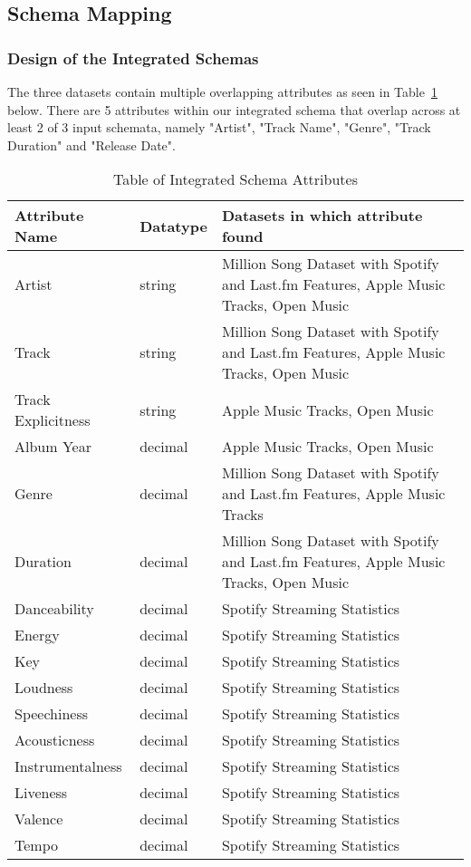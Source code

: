 \documentclass[runningheads]{llncs}
\begin{document}
\subsection{Schema Mapping}
\subsubsection{Design of the Integrated Schemas}
The three datasets contain multiple overlapping attributes as seen in Table~\ref{tab2} below. There are 5 attributes within our integrated schema that overlap across at least 2 of 3 input schemata, namely "Artist", "Track Name", "Genre", "Track Duration" and "Release Date".

\begin{table}[h]
	\renewcommand{\arraystretch}{1.5}
	\caption{Table of Integrated Schema Attributes}\label{tab2}
	\centering
	\begin{tabular}{p{4cm}p{3cm}p{6cm}}
		\toprule
		\textbf{Attribute Name} &  \textbf{ Datatype}&\textbf{Datasets in which  attribute found}\\
		\hline
		\hline
		Artist&string&Million Song Dataset with Spotify and Last.fm Features, Apple Music Tracks, Open Music\\
		Track&string&Million Song Dataset with Spotify and Last.fm Features, Apple Music Tracks, Open Music\\
		Track Explicitness&string&Apple Music Tracks, Open Music\\
		Album Year&decimal&Apple Music Tracks, Open Music\\
		Genre&decimal&Million Song Dataset with Spotify and Last.fm Features, Apple Music Tracks\\
		Duration&decimal&Million Song Dataset with Spotify and Last.fm Features, Apple Music Tracks, Open Music\\
		Danceability&decimal&Spotify  Streaming  Statistics\\
		Energy&decimal&Spotify  Streaming  Statistics\\
		Key&decimal&Spotify  Streaming  Statistics\\
		Loudness&decimal&Spotify  Streaming  Statistics\\
		Speechiness&decimal&Spotify  Streaming  Statistics\\
		Acousticness&decimal&Spotify  Streaming  Statistics\\
		Instrumentalness&decimal&Spotify  Streaming  Statistics\\
		Liveness&decimal&Spotify  Streaming  Statistics\\
		Valence&decimal&Spotify  Streaming  Statistics\\
		Tempo&decimal&Spotify  Streaming  Statistics\\
		\hline
		\hline
	\end{tabular}
\end{table}
\end{document}
